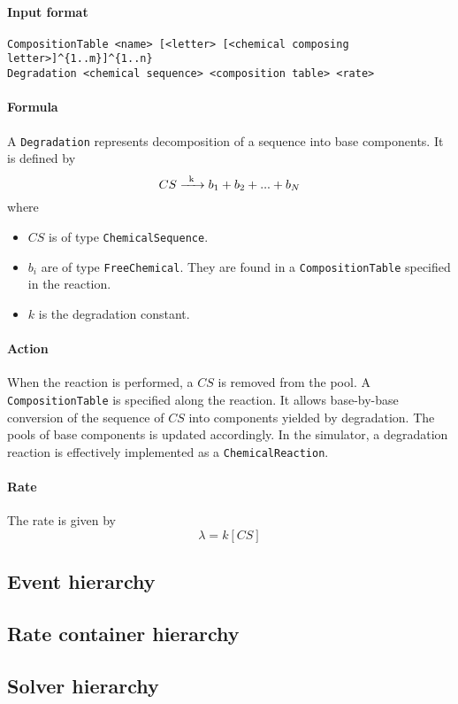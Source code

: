 \paragraph{Input format}
\begin{verbatim}
CompositionTable <name> [<letter> [<chemical composing letter>]^{1..m}]^{1..n}
Degradation <chemical sequence> <composition table> <rate>	
\end{verbatim}

\paragraph{Formula} A \texttt{Degradation} represents decomposition of a sequence into base components. It is defined by
$$
	\reactionIrr{CS}{b_1 + b_2 + ... + b_N}{k}{}
$$
where
\begin{itemize}
	\item $CS$ is of type \texttt{ChemicalSequence}.
	\item $b_i$ are of type \texttt{FreeChemical}. They are found in a \texttt{CompositionTable} specified in the reaction.
	\item $k$ is the degradation constant.
\end{itemize}

\paragraph{Action} When the reaction is performed, a $CS$ is removed from the pool. A \texttt{CompositionTable} is specified along the reaction. It allows base-by-base conversion of the sequence of $CS$ into components yielded by degradation. The pools of base components is updated accordingly. In the simulator, a degradation reaction is effectively implemented as a \texttt{ChemicalReaction}.

\paragraph{Rate} The rate is given by
$$
	\lambda = k [CS]
$$

\subsection{Event hierarchy}

\subsection{Rate container hierarchy}

\subsection{Solver hierarchy}


